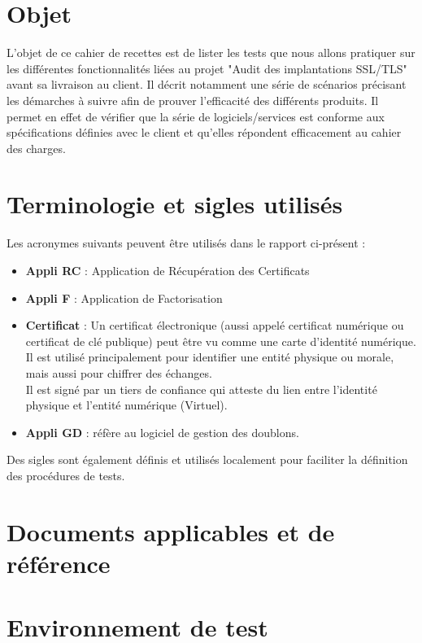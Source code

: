 \documentclass[a4paper,11pt,french]{article}
\begin{document}
\section{Objet}
L'objet de ce cahier de recettes est de lister les tests que nous allons pratiquer sur les différentes fonctionnalités liées au projet "Audit des implantations SSL/TLS" avant sa livraison au client. Il décrit notamment une série de scénarios précisant les démarches à suivre afin de prouver l'efficacité des différents produits. Il permet en effet de vérifier que la série de logiciels/services est conforme aux spécifications définies avec le client et qu'elles répondent efficacement au cahier des charges. 


\section{Terminologie et sigles utilisés}
Les acronymes suivants peuvent être utilisés dans le rapport ci-présent :


\begin{itemize}
	\item \textbf{Appli RC} : Application de Récupération des Certificats
	\item \textbf{Appli F} : Application de Factorisation
	\item \textbf{Certificat} : Un certificat électronique (aussi appelé certificat numérique ou certificat de clé publique) peut être vu comme une carte d'identité numérique. Il est utilisé principalement pour identifier une entité physique ou morale, mais aussi pour chiffrer des échanges. \\Il est signé par un tiers de confiance qui atteste du lien entre l'identité physique et l'entité numérique (Virtuel).
	\item \textbf{Appli GD} : réfère au logiciel de gestion des doublons.

\end{itemize}


Des sigles sont également définis et utilisés localement pour faciliter la définition des procédures de tests.

\section{Documents applicables et de référence}

\section{Environnement de test}
\end{document}
